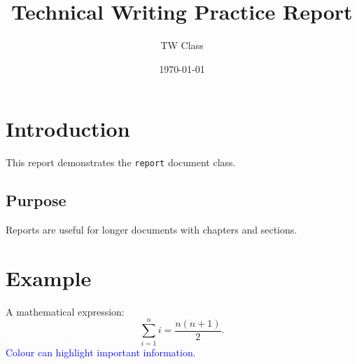 \documentclass[12pt,a4paper]{report}
\title{Technical Writing Practice Report}
\author{TW Class}
\date{\today}
\begin{document}
\maketitle
\tableofcontents

\chapter{Introduction}
This report demonstrates the \texttt{report} document class.

\section{Purpose}
Reports are useful for longer documents with chapters and sections.

\chapter{Example}
A mathematical expression:
\[
  \sum_{i=1}^{n} i = \frac{n(n+1)}{2}.
\]
\textcolor{blue}{Colour can highlight important information.}

\end{document}
